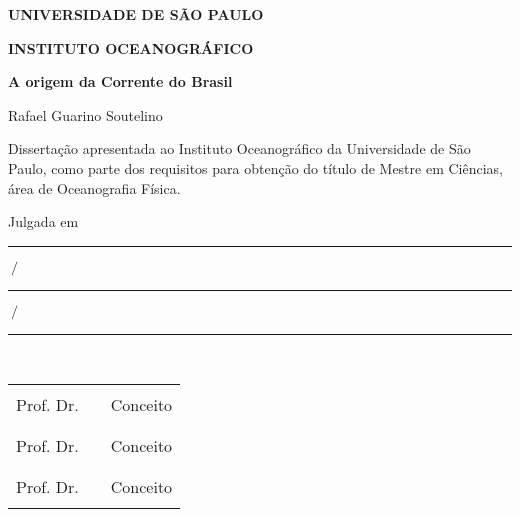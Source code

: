 \begin{center}
{\Large \bf UNIVERSIDADE DE SÃO PAULO}

{\Large \bf INSTITUTO OCEANOGRÁFICO}

\vspace{1in}

{\Large \bf A origem da Corrente do Brasil} \\

\vspace{0.85in}

{\large Rafael Guarino Soutelino} \\

\vspace{0.85in}

Dissertação apresentada ao Instituto Oceanográfico da Universidade de 
São Paulo, como parte dos requisitos para obtenção do título de Mestre 
em Ciências, área de Oceanografia Física.\\

\vspace{.75in}

Julgada em \ \ \rule{1cm}{0.1mm}$ \ /$\rule{1cm}{0.1mm}$ \ /$\rule{1.5cm}{0.1mm}\\

\end{center}

\vspace{.3in}
\renewcommand{\arraystretch}{.8}
\begin{center}
\begin{tabular}{l c c}
\hspace{10cm} & \hspace{1.5cm} & \hspace{2.5cm} \vspace{.3cm} \\
\cline{1-1} \cline{3-3}
Prof. Dr. &  & Conceito \\
 & & \\
 & & \vspace{.75cm} \\
\cline{1-1} \cline{3-3}
Prof. Dr. & & Conceito \\
 & & \\
 & & \vspace{.75cm} \\
\cline{1-1} \cline{3-3}
Prof. Dr. & & Conceito \\
 & & \\
\end{tabular}
\end{center}
